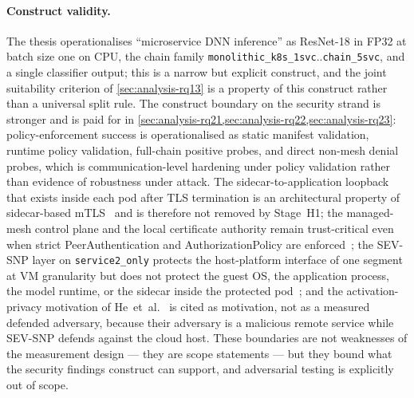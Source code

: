 \paragraph{Construct validity.}
The thesis operationalises ``microservice DNN inference'' as ResNet-18
in FP32 at batch size one on CPU, the chain family
\texttt{monolithic\_k8s\_1svc}..\texttt{chain\_5svc}, and a single
classifier output; this is a narrow but explicit construct, and the
joint suitability criterion of \cref{sec:analysis-rq13} is a property
of this construct rather than a universal split rule. The construct
boundary on the security strand is stronger and is paid for in
\cref{sec:analysis-rq21,sec:analysis-rq22,sec:analysis-rq23}:
policy-enforcement success is operationalised as static manifest validation,
runtime policy validation, full-chain positive probes, and direct
non-mesh denial probes, which is communication-level hardening under
policy validation rather than evidence of robustness under attack. The
sidecar-to-application loopback that exists inside each pod after TLS
termination is an architectural property of sidecar-based
mTLS~\cite{meshinsight_socc23} and is therefore not removed by Stage~H1;
the managed-mesh control plane and the local certificate authority
remain trust-critical even when strict PeerAuthentication and
AuthorizationPolicy are enforced~\cite{poudel2025mazu}; the SEV-SNP
layer on \texttt{service2\_only} protects the host-platform interface
of one segment at VM granularity but does not protect the guest OS,
the application process, the model runtime, or the sidecar inside the
protected pod~\cite{amd_sevsnp_whitepaper}; and the
activation-privacy motivation of
He~et~al.~\cite{he2021_attacking_collaborative} is cited as
motivation, not as a measured defended adversary, because their
adversary is a malicious remote service while SEV-SNP defends against
the cloud host. These boundaries are not weaknesses of the measurement
design --- they are scope statements --- but they bound what the
security findings construct can support, and adversarial testing is
explicitly out of scope.

